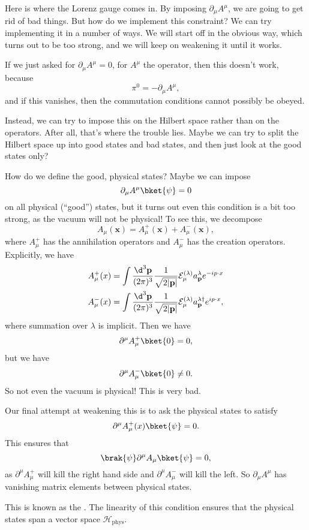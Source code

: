 \documentclass[a4paper]{article}
\begin{document}
Here is where the Lorenz gauge comes in. By imposing $\partial_\mu A^\mu$, we are going to get rid of bad things. But how do we implement this constraint? We can try implementing it in a number of ways. We will start off in the obvious way, which turns out to be too strong, and we will keep on weakening it until it works.

If we just asked for $\partial_\mu A^\mu = 0$, for $A^\mu$ the operator, then this doesn't work, because
\[
  \pi^0 = - \partial_\mu A^\mu,
\]
and if this vanishes, then the commutation conditions cannot possibly be obeyed.

Instead, we can try to impose this on the Hilbert space rather than on the operators. After all, that's where the trouble lies. Maybe we can try to split the Hilbert space up into good states and bad states, and then just look at the good states only?

How do we define the good, physical states? Maybe we can impose
\[
  \partial_\mu A^\mu \bket{\psi} = 0
\]
on all physical (``good'') states, but it turns out even this condition is a bit too strong, as the vacuum will not be physical! To see this, we decompose
\[
  A_\mu(\mathbf{x}) = A_\mu^+ (\mathbf{x}) + A_\mu^-(\mathbf{x}),
\]
where $A_\mu^+$ has the annihilation operators and $A_\mu^-$ has the creation operators. Explicitly, we have
\begin{align*}
  A_\mu^+(x) &= \int \frac{\d^3 \mathbf{p}}{(2\pi)^3} \frac{1}{\sqrt{2|\mathbf{p}|}} \mathcal{E}_\mu^{(\lambda)} a_\mathbf{p}^\lambda e^{-i p\cdot x}\\
  A_\mu^-(x) &= \int \frac{\d^3 \mathbf{p}}{(2\pi)^3} \frac{1}{\sqrt{2|\mathbf{p}|}} \mathcal{E}_\mu^{(\lambda)} a_\mathbf{p}^{\lambda\dagger} e^{ip\cdot x},
\end{align*}
where summation over $\lambda$ is implicit. Then we have
\[
  \partial^\mu A_\mu^+\bket{0} = 0,
\]
but we have
\[
  \partial^\mu A_\mu^- \bket{0} \not= 0.
\]
So not even the vacuum is physical! This is very bad.

Our final attempt at weakening this is to ask the physical states to satisfy
\[
  \partial^\mu A_\mu^+(x) \bket{\psi} = 0.
\]
This ensures that
\[
  \brak{\psi}\partial^\mu A_\mu \bket{\psi} = 0,
\]
as $\partial^\mu A_\mu^+$ will kill the right hand side and $\partial^\mu A_\mu^-$ will kill the left. So $\partial_\mu A^\mu$ has vanishing matrix elements between physical states.

This is known as the . The linearity of this condition ensures that the physical states span a vector space $\mathcal{H}_{\mathrm{phys}}$.
\end{document}
